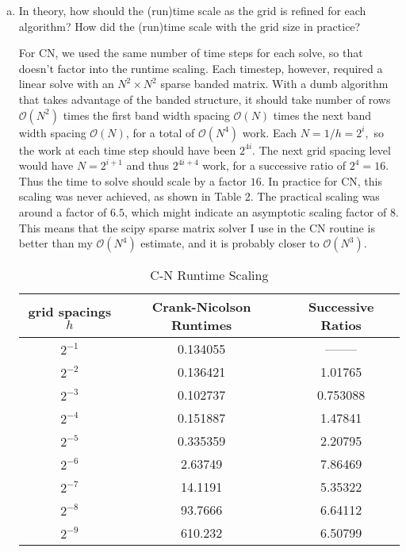 \documentclass[12pt]{article}
\begin{document}
\begin{enumerate}[(a)]
\item In theory, how should the (run)time scale as the grid is refined for each algorithm? How did the (run)time scale with the grid size in practice?

For CN, we used the same number of time steps for each solve, so that doesn't factor into the runtime scaling.  Each timestep, however, required a linear solve with an $N^2\times N^2$ sparse banded matrix.  With a dumb algorithm that takes advantage of the banded structure, it should take number of rows $\mathcal{O}(N^2)$ times the first band width spacing $\mathcal{O}(N)$ times the next band width spacing $\mathcal{O}(N)$, for a total of $\mathcal{O}(N^4)$ work.  Each $N = 1/h = 2^{i},$ so the work at each time step should have been $2^{4i}$. The next grid spacing level would have $N=2^{i+1}$ and thus $2^{4i+4}$ work, for a successive ratio of $2^{4}=16$.  Thus the time to solve should scale by a factor $16$. In practice for CN, this scaling was never achieved, as shown in Table 2.  The practical scaling was around a factor of $6.5$, which might indicate an asymptotic scaling factor of $8$.  This means that the scipy sparse matrix solver I use in the CN routine is better than my $\mathcal{O}(N^4)$ estimate, and it is probably closer to $\mathcal{O}(N^3)$.

\begin{table}[H]
\caption{C-N Runtime Scaling}
\centering\begin{tabular}{||c|c|c||}
\hline \hline
   grid spacings $h$ &   Crank-Nicolson Runtimes &   Successive Ratios \\
\hline
      $2^{-1}$   &                  0.134055 &           --------   \\
      $2^{-2}$   &                  0.136421 &            1.01765  \\
      $2^{-3}$   &                  0.102737 &            0.753088 \\
      $2^{-4}$   &                  0.151887 &            1.47841 \\
      $2^{-5}$   &                  0.335359 &            2.20795    \\
      $2^{-6}$   &                  2.63749  &            7.86469   \\
      $2^{-7}$   &                 14.1191   &            5.35322   \\
      $2^{-8}$   &                 93.7666   &            6.64112   \\
      $2^{-9}$   &                610.232    &            6.50799  \\
\hline \hline
\end{tabular}
\end{table}


\end{enumerate}
\end{document}
